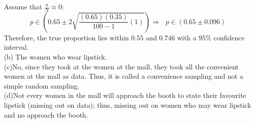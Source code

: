 \documentclass[11pt]{article}
\theoremstyle{claim}
\begin{document}
Assume that $\frac{n}{N}\approx0:$
\[p\in(0.65\pm 2\sqrt{\frac{(0.65)(0.35)}{100-1}(1)}) \Rightarrow \text{ } p\in(0.65\pm 0.096)\]
Therefore, the true proportion lies within $0.55$ and $0.746$ with a $95\%$ confidence interval.
\vspace{5mm}
\\(b) The women who wear lipstick.
\vspace{5mm}
\\(c)No, since they took at the women at the mall, they took all the convenient women at the mall as data. Thus, it is called a convenience sampling and not a simple random sampling.
\vspace{5mm}
\\(d)Not every women in the mall will approach the booth to state their favourite lipstick (missing out on data); thus, missing out on women who may wear lipstick and no approach the booth.
\end{document}
